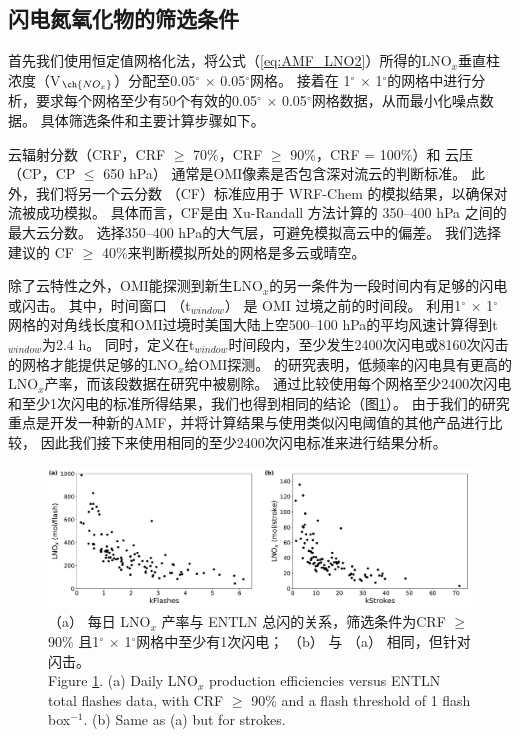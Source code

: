 \subsection{闪电氮氧化物的筛选条件}

首先我们使用恒定值网格化法，将公式（\ref{eq:AMF_LNO2}）所得的LNO$_x$垂直柱浓度（V$_{\ch{NO_x}}$）分配至0.05$^{\circ}$ $\times$ 0.05$^{\circ}$网格\citep{Kuhlmann.2014}。
接着在 1$^{\circ}$ $\times$ 1$^{\circ}$的网格中进行分析，要求每个网格至少有50个有效的0.05$^{\circ}$ $\times$ 0.05$^{\circ}$网格数据，从而最小化噪点数据。
具体筛选条件和主要计算步骤如下。

云辐射分数（CRF，CRF $\geq$ 70\%，CRF $\geq$ 90\%，CRF = 100\%）和 云压（CP，CP $\leq$ 650 hPa）
通常是OMI像素是否包含深对流云的判断标准\citep{Ziemke.2009,Choi.2014,Pickering.2016}。
此外，我们将另一个云分数 （CF）标准应用于 WRF-Chem 的模拟结果，以确保对流被成功模拟。
具体而言，CF是由 Xu-Randall 方法计算的 350--400 hPa 之间的最大云分数\citep{Xu.1996,Strode.2017}。
选择350--400 hPa的大气层，可避免模拟高云中的偏差。
我们选择\citet{Strode.2017}建议的 CF $\geq$ 40\%来判断模拟所处的网格是多云或晴空。

除了云特性之外，OMI能探测到新生LNO$_x$的另一条件为一段时间内有足够的闪电或闪击。
其中，时间窗口 （t$_{window}$） 是 OMI 过境之前的时间段。
\citet{Lapierre.2020}利用1$^{\circ}$ $\times$ 1$^{\circ}$网格的对角线长度和OMI过境时美国大陆上空500--100 hPa的平均风速计算得到t$_{window}$为2.4 h。
同时，\citet{Lapierre.2020}定义在t$_{window}$时间段内，至少发生2400次闪电或8160次闪击的网格才能提供足够的LNO$_x$给OMI探测。
\citet{Bucsela.2019}的研究表明，低频率的闪电具有更高的LNO$_x$产率，而该段数据在\citet{Lapierre.2020}研究中被剔除。
通过比较使用每个网格至少2400次闪电和至少1次闪电的标准所得结果，我们也得到相同的结论（图\ref{fig:us_flash_threshold}）。
由于我们的研究重点是开发一种新的AMF，并将计算结果与使用类似闪电阈值的其他产品进行比较\citep{Pickering.2016,Lapierre.2020}，
因此我们接下来使用相同的至少2400次闪电标准来进行结果分析。


\begin{figure}[!htbp]
    \includegraphics[width=15cm]{./figures/us_flash_threshold.pdf}
    \caption{
    （a） 每日 LNO$_x$ 产率与 ENTLN 总闪的关系，筛选条件为CRF $\geq$ 90\% 且1$^{\circ}$ $\times$ 1$^{\circ}$网格中至少有1次闪电；
     （b） 与 （a） 相同，但针对闪击。\\
    Figure \ref{fig:us_flash_threshold}. (a) Daily LNO$_x$ production efficiencies versus ENTLN total flashes data, with CRF $\geq$ 90\% and a flash threshold of 1 flash box$^{-1}$.
    (b) Same as (a) but for strokes.}
    \label{fig:us_flash_threshold}
\end{figure}


